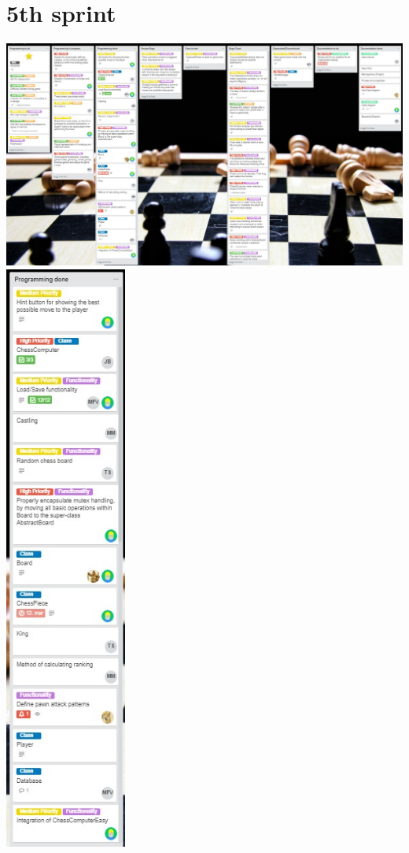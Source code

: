 \documentclass{article}
\begin{document}
\section*{5th sprint}
\includegraphics[width=16cm]{20180503-hele.jpg} \\
\newpage
\includegraphics[width=4cm]{20180503-programmingdone1.jpg}
\end{document}
